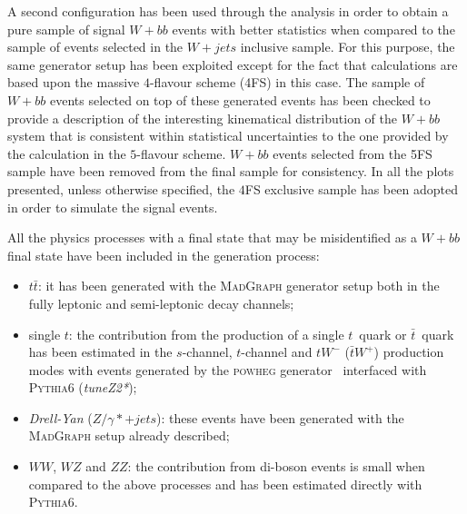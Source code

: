 A second configuration has been used through the analysis in order to obtain a 
pure sample of signal $W + bb$ events with better statistics when compared to 
the sample of events selected in the $W + jets$ inclusive sample.
For this purpose, the same generator setup has been exploited except for the fact that 
calculations are based upon the massive $4$-flavour scheme (4FS) in this case.
The sample of $W + bb$ events selected on top of these generated events has 
been checked to provide a description of the interesting kinematical distribution of 
the $W + bb$ system that is consistent within statistical uncertainties to the 
one provided by the calculation in the $5$-flavour scheme.
$W + bb$ events selected from the 5FS sample have been removed from the 
final sample for consistency.
In all the plots presented, unless otherwise specified, the 
$4$FS exclusive sample has been adopted in order to simulate the signal events.

All the physics processes with a final state that may be misidentified as a 
$W + bb$ final state have been included in the generation process:
\begin{itemize}
  \item $t\bar{t}$: it has been generated with the \textsc{MadGraph} generator 
    setup both in the fully leptonic and semi-leptonic decay channels;
  \item single $t$: the contribution from the production of a single $t$~quark 
    or $\bar{t}$~quark has been estimated in the $s$-channel, $t$-channel and 
    $tW^{-}$ ($\bar{t}W^{+}$) production modes with events generated by the 
    \textsc{powheg} generator~\cite{POWHEG} interfaced with \textsc{Pythia6} 
    (\textit{tuneZ2*});
  \item \textit{Drell-Yan} ($Z/\gamma* + jets$): these events have been generated with 
    the \textsc{MadGraph} setup already described;
  \item $WW$, $WZ$ and $ZZ$: the contribution from di-boson events is small when compared 
    to the above processes and has been estimated directly with \textsc{Pythia6}.
\end{itemize}

